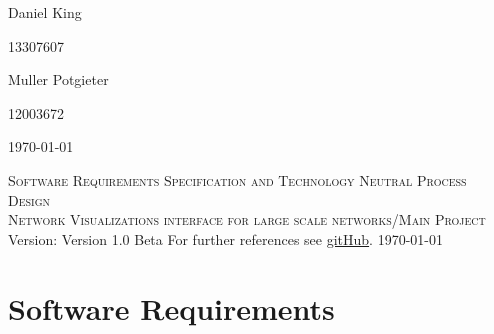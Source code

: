 \documentclass[a4paper,12pt]{report}
\begin{document}
\begin{titlepage}
\begin{center}
\begin{minipage}{0.4\textwidth}
\begin{flushleft} \large
Daniel {King}
\end{flushleft}
\end{minipage}
\begin{minipage}{0.4\textwidth}
\begin{flushright} \large
\emph{}
13307607
\end{flushright}
\end{minipage}

\begin{minipage}{0.4\textwidth}
\begin{flushleft} \large
Muller {Potgieter}
\end{flushleft}
\end{minipage}
\begin{minipage}{0.4\textwidth}
\begin{flushright} \large
\emph{}
12003672
\end{flushright}
\end{minipage}


\vfill
{\large \today}
\end{center}
\end{titlepage}
\footnotesize
%
\normalsize

\renewcommand{\thesection}{\arabic{section}}
\newpage
\begin{center}
\textsc{\LARGE Software Requirements Specification and Technology Neutral Process Design}\\[1.5cm]
\textsc{\Large Network Visualizations interface for large scale networks/Main Project}\\[0.5cm]
Version: Version 1.0 Beta
For further references see \href{ https://github.com/u13133064/NotLikeThis}{gitHub}.
\today
\end{center}
\tableofcontents{}
\newpage
\section{Software Requirements}
\end{document}
